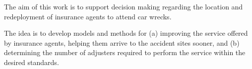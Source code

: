 The aim of this work
is to support decision making
regarding the location and redeployment
of insurance agents to attend car wrecks.

The idea is to
develop models and methods for 
(a) improving the service 
offered by insurance agents, 
helping them
arrive to the accident sites sooner,
and 
(b) determining the number of adjusters
required to perform the service
within the desired standards.
